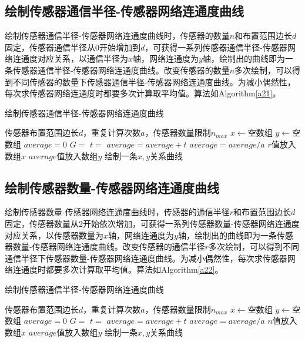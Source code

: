 \documentclass[a4paper]{ctexart}
\begin{document}
\begin{spacing}{1}
\subsection{绘制传感器通信半径-传感器网络连通度曲线}
绘制传感器通信半径-传感器网络连通度曲线时，传感器的数量$n$和布置范围边长$d$固定，传感器通信半径从0开始增加到$d$，可获得一系列传感器通信半径-传感器网络连通度对应关系，以通信半径为$x$轴，网络连通度为$y$轴，绘制出的曲线即为一条传感器通信半径-传感器网络连通度曲线。改变传感器的数量$n$多次绘制，可以得到不同传感器的数量下传感器通信半径-传感器网络连通度曲线。为减小偶然性，每次求传感器网络连通度时都要多次计算取平均值。算法如Algorithm\ref{a21}。
\begin{algorithm}
	\caption{绘制传感器通信半径-传感器网络连通度曲线}
	\label{a21}
	\begin{algorithmic}[1]
		\Require 传感器布置范围边长$d$，重复计算次数$a$，传感器数量限制$n_{max}$
		\State$x\gets$空数组
		\State$y\gets$空数组
		\State$average=0$
		\State$G=$
		\State$t=$
		\State$average=average+t$
		\EndFor
		\State$average=average/a$
		\State$r$值放入数组$x$
		\State$average$值放入数组$y$
		\EndFor
		\State 绘制一条$x,y$关系曲线
		\EndFor
	\end{algorithmic}
\end{algorithm}

\subsection{绘制传感器数量-传感器网络连通度曲线}
绘制传感器数量-传感器网络连通度曲线时，传感器的通信半径$r$和布置范围边长$d$固定，传感器数量从2开始依次增加，可获得一系列传感器数量-传感器网络连通度对应关系，以传感器数量为$x$轴，网络连通度为$y$轴，绘制出的曲线即为一条传感器数量-传感器网络连通度曲线。改变传感器的通信半径$r$多次绘制，可以得到不同通信半径下传感器数量-传感器网络连通度曲线。为减小偶然性，每次求传感器网络连通度时都要多次计算取平均值。算法如Algorithm\ref{a22}。

\begin{algorithm}
	\caption{绘制传感器通信半径-传感器网络连通度曲线}
	\label{a22}
	\begin{algorithmic}[1]
		\Require 传感器布置范围边长$d$，重复计算次数$a$，传感器数量限制$n_{max}$
		\State$x\gets$空数组
		\State$y\gets$空数组
		\State$average=0$
		\State$G=$
		\State$t=$
		\State$average=average+t$
		\EndFor
		\State$average=average/a$
		\State$n$值放入数组$x$
		\State$average$值放入数组$y$
		\EndFor
		\State 绘制一条$x,y$关系曲线
		\EndFor
	\end{algorithmic}
\end{algorithm}


\end{spacing}
\end{document}
